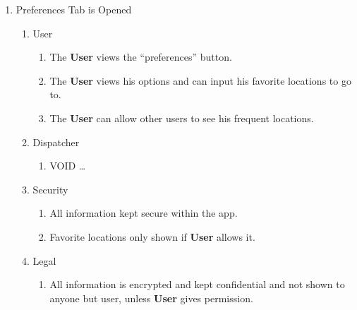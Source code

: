 \documentclass[english]{article}
\begin{document}
\begin{enumerate}[{BE}1.]
	\item Preferences Tab is Opened
	\begin{enumerate}[{VP12}.1]
		\item User
		\begin{enumerate}
			\item The \textbf{User} views the “preferences” button.
			\item The \textbf{User} views his options and can input his favorite locations to go to.
			\item The \textbf{User} can allow other users to see his frequent locations.
		\end{enumerate}
		\item Dispatcher
		\begin{enumerate}
			\item VOID
			 \dots
		\end{enumerate}
		\item Security
		\begin{enumerate}
			\item All information kept secure within the app.
			\item Favorite locations only shown if \textbf{User} allows it.
		\end{enumerate}
		\item Legal
		\begin{enumerate}
			\item All information is encrypted and kept confidential and not shown to anyone but user, unless \textbf{User} gives permission.
		\end{enumerate}
	\end{enumerate}
	

\end{enumerate}
\end{document}
